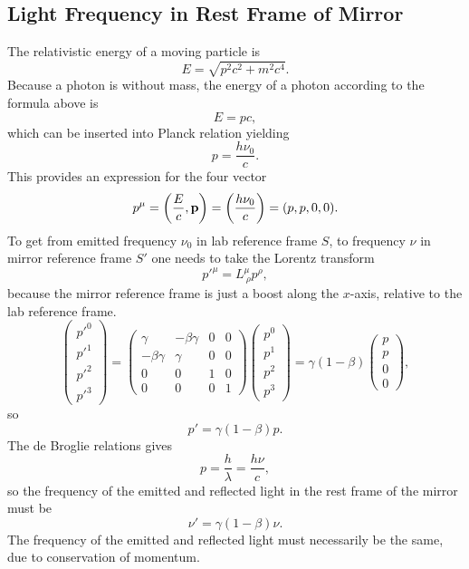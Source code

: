 \documentclass[11pt]{amsart}
\begin{document}
\subsection{Light Frequency in Rest Frame of Mirror}
The relativistic energy of a moving particle is 
\begin{equation}
E = \sqrt{p^2c^2 + m^2c^4}.
\end{equation}
Because a photon is without mass, the energy of a photon according to the formula above is
\begin{equation}
E = pc,
\end{equation}
which can be inserted into Planck relation yielding
\begin{equation}
p = \frac{h \nu_0}{c}.
\end{equation}
This provides an expression for the four vector
\begin{equation}
p^\mu = \left(\frac{E}{c}, \vb{p} \right) = \left(\frac{h\nu_0}{c} \right) = (p,p,0,0).
\end{equation} 
To get from emitted frequency $\nu_0$ in lab reference frame $S$, to frequency $\nu$ in mirror reference frame $S'$ one needs to take the Lorentz transform 
\begin{equation}
p'^\mu = L^\mu_{\ \rho} p^\rho,
\end{equation}
because the mirror reference frame is just a boost along the $x$-axis, relative to the lab reference frame.
\begin{equation}
\begin{pmatrix}
p'^0 \\ p'^1 \\ p'^2 \\ p'^3
\end{pmatrix}
=
\begin{pmatrix}
\gamma & -\beta\gamma & 0 & 0 \\
-\beta\gamma & \gamma & 0 & 0 \\
0 & 0 & 1 & 0 \\
0 & 0 & 0 & 1
\end{pmatrix}
\begin{pmatrix}
p^0 \\ p^1 \\ p^2 \\ p^3
\end{pmatrix}
=
\gamma(1-\beta)
\begin{pmatrix}
p \\ p \\ 0 \\ 0
\end{pmatrix},
\end{equation}
so
\begin{equation}
p' = \gamma(1-\beta)p.
\end{equation}
The de Broglie relations gives
\begin{equation}
p = \frac{h}{\lambda} = \frac{h\nu}{c},
\end{equation}
so the frequency of the emitted and reflected light in the rest frame of the mirror must be
\begin{equation}
\nu' = \gamma(1-\beta)\nu.
\end{equation}
The frequency of the emitted and reflected light must necessarily be the same, due to conservation of momentum.
\end{document}
